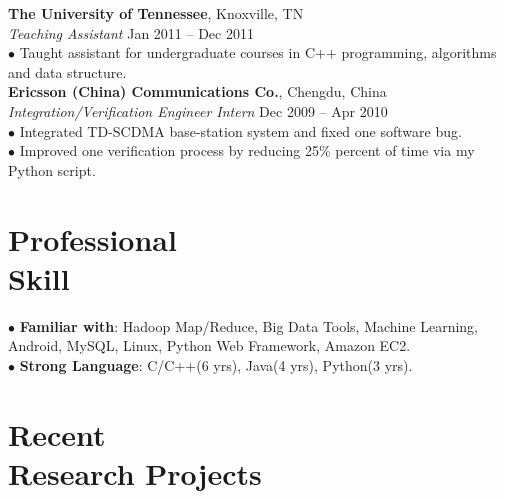\documentclass[margin, centered]{resume}
\begin{document}
\begin{resume}
    \textbf{The University of Tennessee}, Knoxville, TN \\\vspace{0mm}%
    \emph{Teaching Assistant} \hfill Jan 2011 -- Dec 2011\vspace{0mm}\\
    $\bullet$ Taught assistant for undergraduate courses in C++ programming, algorithms and data structure.\vspace{-6mm}\\
	
    \textbf{Ericsson (China) Communications Co.}, Chengdu, China \vspace{0mm}\\%
	\emph{Integration/Verification Engineer Intern} \hfill Dec 2009 -- Apr 2010\vspace{0mm}\\
    $\bullet$ Integrated TD-SCDMA base-station system and fixed one software bug.\vspace{0mm}\\
    $\bullet$ Improved one verification process by reducing 25\% percent of time via my Python script.\vspace{-5mm}\\

    \section{\mysidestyle Professional \\Skill} 
	
	$\bullet$ \textbf{Familiar with}: Hadoop Map/Reduce, Big Data Tools, Machine Learning, Android, MySQL, Linux, Python Web Framework, Amazon EC2.\vspace{0mm}\\
    $\bullet$ \textbf{Strong Language}: C/C++(6 yrs), Java(4 yrs), Python(3 yrs).\vspace{-5mm}\\

    \section{\mysidestyle Recent \\Research Projects}
	

\end{resume}
\end{document}
